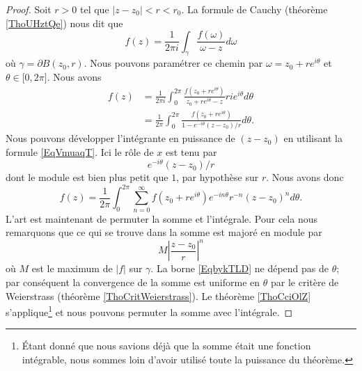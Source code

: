 \begin{proof}
    Soit \( r>0\) tel que \( | z-z_0 |<r<r_0\). La formule de Cauchy (théorème \ref{ThoUHztQe}) nous dit que
    \begin{equation}
        f(z)=\frac{1}{ 2\pi i }\int_{\gamma}\frac{ f(\omega)}{ \omega-z }d\omega
    \end{equation}
    où \( \gamma=\partial B(z_0,r)\). Nous pouvons paramétrer ce chemin par \( \omega=z_0+r e^{i\theta}\) et \( \theta\in \mathopen[ 0 , 2\pi \mathclose]\). Nous avons
    \begin{subequations}
        \begin{align}
            f(z)&=\frac{1}{ 2\pi i }\int_0^{2\pi}\frac{ f(z_0+r e^{i\theta}) }{ z_0+r e^{i\theta}-z }ri e^{i\theta}d\theta\\
            &=\frac{1}{ 2\pi }\int_0^{2\pi}\frac{ f(z_0+r e^{i\theta}) }{ 1- e^{-i\theta}(z-z_0)/r }d\theta.
        \end{align}
    \end{subequations}
    Nous pouvons développer l'intégrante en puissance de \( (z-z_0)\) en utilisant la formule \ref{EqVmuaqT}. Ici le rôle de \( x\) est tenu par
    \begin{equation}
        e^{-i\theta}(z-z_0)/r
    \end{equation}
    dont le module est bien plus petit que \( 1\), par hypothèse sur \( r\). Nous avons donc
    \begin{equation}
        f(z)=\frac{1}{ 2\pi }\int_0^{2\pi}\sum_{n=0}^{\infty}f(z_0+r e^{i\theta}) e^{-in\theta}r^{-n}(z-z_0)^nd\theta.
    \end{equation}
    L'art est maintenant de permuter la somme et l'intégrale. Pour cela nous remarquons que ce qui se trouve dans la somme est majoré en module par
    \begin{equation}        \label{EqbykTLD}
        M\left| \frac{ z-z_0 }{ r } \right|^n
    \end{equation}
    où \( M\) est le maximum de \( | f |\) sur \( \gamma\). La borne \eqref{EqbykTLD} ne dépend pas de \( \theta\); par conséquent la convergence de la somme est uniforme en \( \theta\) par le critère de Weierstrass (théorème \ref{ThoCritWeierstrass}). Le théorème \ref{ThoCciOlZ} s'applique\footnote{Étant donné que nous savions déjà que la somme était une fonction intégrable, nous sommes loin d'avoir utilisé toute la puissance du théorème.} et nous pouvons permuter la somme avec l'intégrale.


\end{proof}
